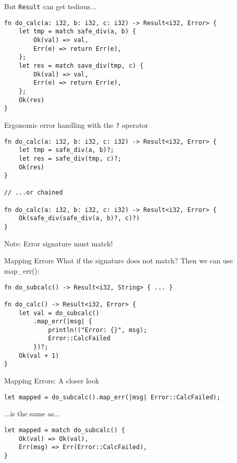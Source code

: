 
\begin{frame}[fragile]{But \texttt{Result} can get tedious...}
\begin{verbatim}
fn do_calc(a: i32, b: i32, c: i32) -> Result<i32, Error> {
    let tmp = match safe_div(a, b) {
        Ok(val) => val,
        Err(e) => return Err(e),
    };
    let res = match save_div(tmp, c) {
        Ok(val) => val,
        Err(e) => return Err(e),
    };
    Ok(res)
}
\end{verbatim}
\end{frame}


\begin{frame}[fragile]{Ergonomic error handling with the \texttt{?} operator}
\begin{verbatim}
fn do_calc(a: i32, b: i32, c: i32) -> Result<i32, Error> {
    let tmp = safe_div(a, b)?;
    let res = safe_div(tmp, c)?;
    Ok(res)
}

// ...or chained

fn do_calc(a: i32, b: i32, c: i32) -> Result<i32, Error> {
    Ok(safe_div(safe_div(a, b)?, c)?)
}
\end{verbatim}
\pause
Note: Error signature must match!
\end{frame}


\begin{frame}[fragile]{Mapping Errors}
What if the signature does not match?
\pause
Then we can use map\_err():
\begin{verbatim}
fn do_subcalc() -> Result<i32, String> { ... }

fn do_calc() -> Result<i32, Error> {
    let val = do_subcalc()
        .map_err(|msg| {
            println!("Error: {}", msg);
            Error::CalcFailed
        })?;
    Ok(val + 1)
}
\end{verbatim}
\end{frame}


\begin{frame}[fragile]{Mapping Errors: A closer look}
\begin{verbatim}
let mapped = do_subcalc().map_err(|msg| Error::CalcFailed);
\end{verbatim}
...is the same as...
\begin{verbatim}
let mapped = match do_subcalc() {
    Ok(val) => Ok(val),
    Err(msg) => Err(Error::CalcFailed),
}
\end{verbatim}
\end{frame}

